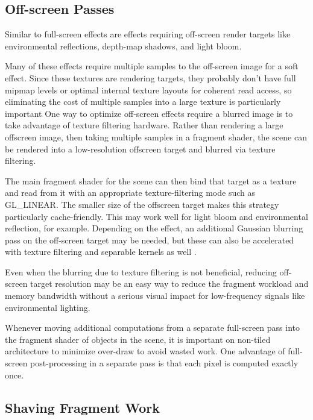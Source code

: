 \subsection{Off-screen Passes}
\label{Jon-McCaffrey-Off-Screen-Pass}

Similar to full-screen effects are effects requiring off-screen render targets
like environmental reflections, depth-map shadows, and light bloom.

Many of these effects require multiple samples to the off-screen image for a
soft effect.  Since these textures are rendering targets, they probably don't
have full mipmap levels or optimal internal texture layouts for coherent read
access, so eliminating the cost of multiple samples into a large texture is
particularly important One way to optimize off-screen effects require a blurred
image is to take advantage of texture filtering hardware.  Rather than
rendering a large offscreen image, then taking multiple samples in a fragment
shader, the scene can be rendered into a low-resolution offscreen target and
blurred via texture filtering.

The main fragment shader for the scene can then bind that target as a texture
and read from it with an appropriate texture-filtering mode such as GL\_LINEAR.
The smaller size of the offscreen target makes this strategy particularly
cache-friendly.  This may work well for light bloom and environmental
reflection, for example.  Depending on the effect, an additional Gaussian
blurring pass on the off-screen target may be needed, but these can also be
accelerated with texture filtering and separable kernels as well \cite{Rideout}.

Even when the blurring due to texture filtering is not beneficial, reducing
off-screen target resolution may be an easy way to reduce the fragment workload
and memory bandwidth without a serious visual impact for low-frequency signals
like environmental lighting.

Whenever moving additional computations from a separate full-screen pass into
the fragment shader of objects in the scene, it is important on non-tiled
architecture to minimize over-draw to avoid wasted work.  One advantage of
full-screen post-processing in a separate pass is that each pixel is computed
exactly once.

\subsection{Shaving Fragment Work}
\label{Jon-McCaffrey-Shaving-Fragment-Work}

